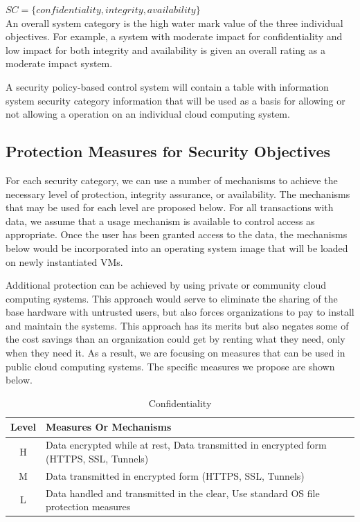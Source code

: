 \documentclass{sig-alternate}
\begin{document}
\begin{math}
SC= \{confidentiality,integrity,availability\}
\end{math}
\\

An overall system category is the high water mark value of the three individual objectives.  For example, a system with moderate impact for confidentiality and low impact for both integrity and availability is given an overall rating as a moderate impact system.

A security policy-based control system will contain a table with information system security category information that will be used as a basis for allowing or not allowing a operation on an individual cloud computing system.

\subsection{Protection Measures for Security Objectives}
For each security category, we can use a number of mechanisms to achieve the necessary level of protection, integrity assurance, or availability.  The mechanisms that may be used for each level are proposed below.  For all transactions with data, we assume that a usage mechanism is available to control access as appropriate.  Once the user has been granted access to the data, the mechanisms below would be incorporated into an operating system image that will be loaded on newly instantiated VMs.

Additional protection can be achieved by using private or community cloud computing systems.  This approach would serve to eliminate the sharing of the base hardware with untrusted users, but also forces organizations to pay to install and maintain the systems.  This approach has its merits but also negates some of the cost savings than an organization could get by renting what they need, only when they need it.  As a result, we are focusing on measures that can be used in public cloud computing systems.  The specific measures we propose are shown below.

\begin{table}[ht]
\begin{tabular}{|c|p{2.5in}|}
\hline
Level &  Measures Or Mechanisms \\
\hline
H & Data encrypted while at rest, 
    Data transmitted in encrypted form (HTTPS, SSL, Tunnels) \\
\hline
M & Data transmitted in encrypted form (HTTPS, SSL, Tunnels) \\
\hline
L & Data handled and transmitted in the clear,
    Use standard OS file protection measures \\
\hline
\end{tabular}
\caption{Confidentiality}
\end{table}
\end{document}
